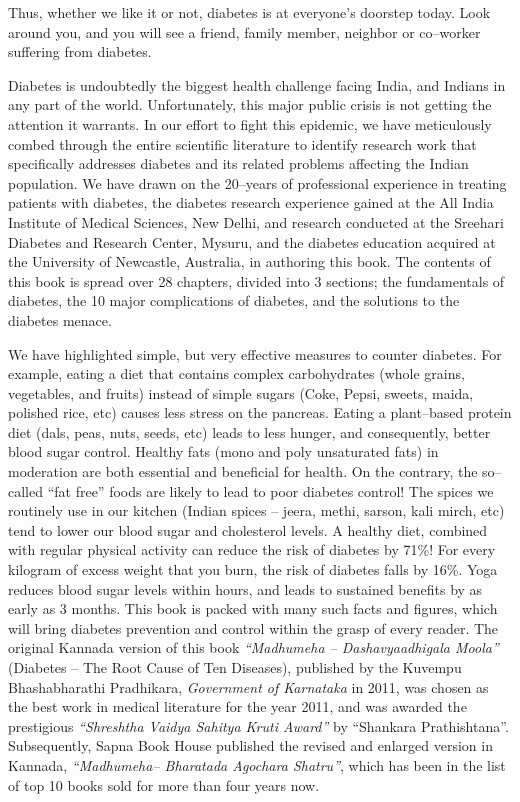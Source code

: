 Thus, whether we like it or not, diabetes is at everyone’s doorstep today. Look around you, and you will see a friend, family member, neighbor or co–worker suffering from diabetes.

Diabetes is undoubtedly the biggest health challenge facing India, and Indians in any part of the world. Unfortunately, this major public crisis is not getting the attention it warrants. In our effort to fight this epidemic, we have meticulously combed through the entire scientific literature to identify research work that specifically addresses diabetes and its related problems affecting the Indian population. We have drawn on the 20–years of professional experience in treating patients with diabetes, the diabetes research experience gained at the All India Institute of Medical Sciences, New Delhi, and research conducted at the Sreehari Diabetes and Research Center, Mysuru, and the diabetes education acquired at the University of Newcastle, Australia, in authoring this book. The contents of this book is spread over 28 chapters, divided into 3 sections; the fundamentals of diabetes, the 10 major complications of diabetes, and the solutions to the diabetes menace.

We have highlighted simple, but very effective measures to counter diabetes. For example, eating a diet that contains complex carbohydrates (whole grains, vegetables, and fruits) instead of simple sugars (Coke, Pepsi, sweets, maida, polished rice, etc) causes less stress on the pancreas. Eating a plant–based protein diet (dals, peas, nuts, seeds, etc) leads to less hunger, and consequently, better blood sugar control. Healthy fats (mono and poly unsaturated fats) in moderation are both essential and beneficial for health. On the contrary, the so–called “fat free” foods are likely to lead to poor diabetes control! The spices we routinely use in our kitchen (Indian spices – jeera, methi, sarson, kali mirch, etc) tend to lower our blood sugar and cholesterol levels. A healthy diet, combined with regular physical activity can reduce the risk of diabetes by 71\%! For every kilogram of excess weight that you burn, the risk of diabetes falls by 16\%. Yoga reduces blood sugar levels within hours, and leads to sustained benefits by as early as 3 months. This book is packed with many such facts and figures, which will bring diabetes prevention and control within the grasp of every reader. The original Kannada version of this book \textit{“Madhumeha – Dashavyaadhigala Moola”} (Diabetes – The Root Cause of Ten Diseases), published by the Kuvempu Bhashabharathi Pradhikara, \textit{Government of Karnataka} in 2011, was chosen as the best work in medical literature for the year 2011, and was awarded the prestigious \textit{“Shreshtha Vaidya Sahitya Kruti Award”} by “Shankara Prathishtana”. Subsequently, Sapna Book House published the revised and enlarged version in Kannada, \textit{“Madhumeha– Bharatada Agochara Shatru”}, which has been in the list of top 10 books sold for more than four years now.

